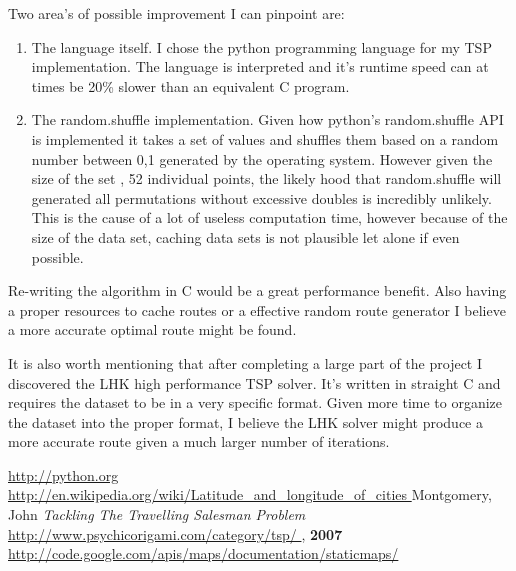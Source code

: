 \documentclass[12pt]{article}
\begin{document}
Two area's of possible improvement I can pinpoint are:
\begin{enumerate}
\item The language itself. I chose the python programming language for my TSP implementation.
The language is interpreted and it's runtime speed can at times be 20\% slower than an equivalent C program.
\item The random.shuffle implementation. Given how python's random.shuffle API is implemented it takes a set
of values and shuffles them based on a random number between 0,1 generated by the operating system. However given the size of the set
, 52 individual points, the likely hood that random.shuffle will generated all permutations without excessive doubles is incredibly unlikely.
This is the cause of a lot of useless computation time, however because of the size of the data set, caching data sets is not plausible let alone if even possible.
\end{enumerate}

Re-writing the algorithm in C would be a great performance benefit. Also having a proper resources to cache routes or a effective random route generator I believe a more accurate optimal route might be found.

It is also worth mentioning that after completing a large part of the project I discovered the LHK\cite{LHK} high performance TSP solver. It's written in straight C and requires the dataset to be in a very specific format.
Given more time to organize the dataset into the proper format, I believe the LHK solver might produce a more accurate route given a much larger number of iterations. 
\begin{thebibliography}{99}
 {\href{ http://python.org }{ http://python.org }}
 {\href{ http://en.wikipedia.org/wiki/Latitude_and_longitude_of_cities }{ http://en.wikipedia.org/wiki/Latitude\_and\_longitude\_of\_cities }}
 Montgomery, John {\it Tackling The Travelling Salesman Problem }{\href{ http://www.psychicorigami.com/category/tsp/ }{ http://www.psychicorigami.com/category/tsp/ } }, {\bf 2007}
 {\href{ http://code.google.com/apis/maps/documentation/staticmaps/  }{ http://code.google.com/apis/maps/documentation/staticmaps/ }}

\end{thebibliography}
\end{document}
